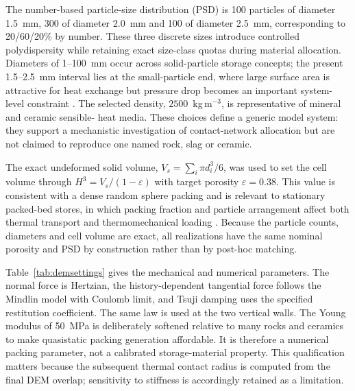 \documentclass[12pt,a4paper]{article}
\begin{document}
	The number-based particle-size distribution (PSD) is 100 particles of diameter
	1.5~mm, 300 of diameter 2.0~mm and 100 of diameter 2.5~mm, corresponding to
	20/60/20\% by number. These three discrete sizes introduce controlled
	polydispersity while retaining exact size-class quotas during material
	allocation. Diameters of 1--100~mm occur across solid-particle storage concepts;
	the present 1.5--2.5~mm interval lies at the small-particle end, where large
	surface area is attractive for heat exchange but pressure drop becomes an
	important system-level constraint \cite{Zeng2025,Knoedler2019}. The selected
	density, $2500$~kg\,m$^{-3}$, is representative of mineral and ceramic sensible-
	heat media. These choices define a generic model system: they support a
	mechanistic investigation of contact-network allocation but are not claimed to
	reproduce one named rock, slag or ceramic.
	
	The exact undeformed solid volume,
	$V_s=\sum_i\pi d_i^3/6$, was used to set the cell volume through
	$H^3=V_s/(1-\varepsilon)$ with target porosity $\varepsilon=0.38$. This value is
	consistent with a dense random sphere packing and is relevant to stationary
	packed-bed stores, in which packing fraction and particle arrangement affect
	both thermal transport and thermomechanical loading
	\cite{Knoedler2019,Garitaonandia2024}. Because the particle counts, diameters and
	cell volume are exact, all realizations have the same nominal porosity and PSD by
	construction rather than by post-hoc matching.
	
	Table~\ref{tab:demsettings} gives the mechanical and numerical parameters. The
	normal force is Hertzian, the history-dependent tangential force follows the
	Mindlin model with Coulomb limit, and Tsuji damping uses the specified
	restitution coefficient. The same law is used at the two vertical walls. The
	Young modulus of 50~MPa is deliberately softened relative to many rocks and
	ceramics to make quasistatic packing generation affordable. It is therefore a
	numerical packing parameter, not a calibrated storage-material property. This
	qualification matters because the subsequent thermal contact radius is computed
	from the final DEM overlap; sensitivity to stiffness is accordingly retained as
	a limitation.
	
\end{document}

